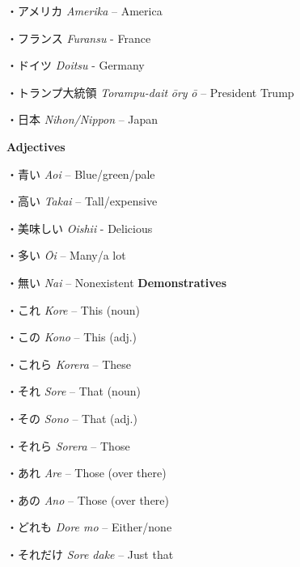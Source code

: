 \par{・アメリカ \emph{Amerika }– America }
 
\par{・フランス  \emph{Furansu }- France }
 
\par{・ドイツ  \emph{Doitsu }- Germany }
 
\par{・トランプ大統領  \emph{Torampu-dait }\emph{ōry }\emph{ō }– President Trump }
 
\par{・日本  \emph{Nihon\slash Nippon }– Japan }
 
\par{\textbf{Adjectives }}
 
\par{・青い  \emph{Aoi }– Blue\slash green\slash pale }
 
\par{・高い  \emph{Takai }– Tall\slash expensive }
 
\par{・美味しい  \emph{Oishii }- Delicious }
 
\par{・多い  \emph{Ōi }– Many\slash a lot }
 
\par{・無い  \emph{Nai }– Nonexistent }
 \textbf{Demonstratives } 
\par{・これ  \emph{Kore }– This (noun) }
 
\par{・この  \emph{Kono }– This (adj.) }
 
\par{・これら  \emph{Korera }– These }
 
\par{・それ  \emph{Sore }– That (noun) }
 
\par{・その  \emph{Sono }– That (adj.) }
 
\par{・それら  \emph{Sorera }– Those }
 
\par{・あれ  \emph{Are }– Those (over there) }
 
\par{・あの  \emph{Ano }– Those (over there) }
 
\par{・どれも  \emph{Dore mo }– Either\slash none }
 
\par{・それだけ  \emph{Sore dake }– Just that }
 
